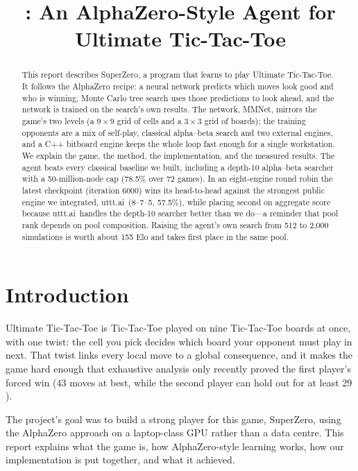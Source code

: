 \documentclass[conference]{IEEEtran}
\title{\sys: An AlphaZero-Style Agent for Ultimate Tic-Tac-Toe}
\author{\IEEEauthorblockN{Zamiul Rashid}}
\newcommand{\utttai}{uttt.ai}
\newcommand{\sys}{SuperZero}   %
\newcommand{\net}{MMNet}       %
\begin{document}
\maketitle

\begin{abstract}
This report describes \sys, a program that learns to play Ultimate
Tic-Tac-Toe. It follows the AlphaZero recipe: a neural network predicts which moves look
good and who is winning, Monte Carlo tree search uses those predictions to
look ahead, and the network is trained on the search's own results. The
network, \net, mirrors the game's two levels (a $9\times9$ grid of cells
and a $3\times3$ grid of boards); the training opponents are a mix of self-play,
classical alpha--beta search and two external engines, and a C++ bitboard
engine keeps the whole loop fast enough for a single workstation. We
explain the game, the method, the implementation, and the measured results.
The agent beats every classical baseline we built, including a depth-10
alpha--beta searcher with a 50-million-node cap (78.5\% over 72 games). In
an eight-engine round robin the latest checkpoint (iteration 6000) wins its
head-to-head against the strongest public engine we integrated, \utttai\
(8--7--5, 57.5\%), while placing second on aggregate score because \utttai\
handles the depth-10 searcher better than we do---a reminder that pool rank
depends on pool composition. Raising the agent's own search from 512 to
2{,}000 simulations is worth about 155 Elo and takes first place in the same
pool.
\end{abstract}

\section{Introduction}

Ultimate Tic-Tac-Toe is Tic-Tac-Toe played on nine Tic-Tac-Toe boards at
once, with one twist: the cell you pick decides which board your opponent
must play in next. That twist links every local move to a global
consequence, and it makes the game hard enough that exhaustive analysis
only recently proved the first player's forced win (43 moves at best, while
the second player can hold out for at least 29 \cite{bertholon2020uttt}).

The project's goal was to build a strong player for this game, \sys,
using the AlphaZero approach \cite{silver2017alphazero} on a laptop-class
GPU rather than a data centre. This report explains what the game is, how
AlphaZero-style learning works, how our implementation is put together,
and what it achieved.
\end{document}
